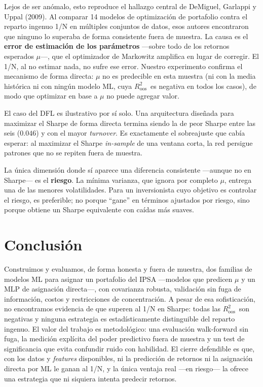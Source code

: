 \documentclass[11pt]{article}
\newcommand{\Roos}{$R^2_{\text{oos}}$}
\begin{document}
Lejos de ser anómalo, esto reproduce el hallazgo central de DeMiguel, Garlappi y Uppal (2009). Al
comparar 14 modelos de optimización de portafolio contra el reparto ingenuo 1/N en múltiples conjuntos
de datos, esos autores encontraron que ninguno lo superaba de forma consistente fuera de muestra. La
causa es el \textbf{error de estimación de los parámetros} ---sobre todo de los retornos esperados
$\mu$---, que el optimizador de Markowitz amplifica en lugar de corregir. El 1/N, al no estimar nada,
no sufre ese error. Nuestro experimento confirma el mecanismo de forma directa: $\mu$ no es predecible
en esta muestra (ni con la media histórica ni con ningún modelo ML, cuya \Roos\ es negativa en todos
los casos), de modo que optimizar en base a $\mu$ no puede agregar valor.

El caso del DFL es ilustrativo por sí solo. Una arquitectura diseñada para maximizar el Sharpe de
forma directa termina siendo la de peor Sharpe entre las seis ($0.046$) y con el mayor
\emph{turnover}. Es exactamente el sobreajuste que cabía esperar: al maximizar el Sharpe
\emph{in-sample} de una ventana corta, la red persigue patrones que no se repiten fuera de muestra.

La única dimensión donde sí aparece una diferencia consistente ---aunque no en Sharpe--- es el
\textbf{riesgo}. La mínima varianza, que ignora por completo $\mu$, entrega una de las menores volatilidades. Para un inversionista cuyo objetivo es controlar el riesgo, es preferible; no
porque ``gane'' en términos ajustados por riesgo, sino porque obtiene un Sharpe equivalente con caídas
más suaves.

\section{Conclusión}
Construimos y evaluamos, de forma honesta y fuera de muestra, dos familias de modelos ML para asignar
un portafolio del IPSA ---modelos que predicen $\mu$ y un MLP de asignación directa---, con covarianza
robusta, validación sin fuga de información, costos y restricciones de concentración. A pesar de esa
sofisticación, no encontramos evidencia de que superen al 1/N en Sharpe: todas las \Roos\ son
negativas y ninguna estrategia es estadísticamente distinguible del reparto ingenuo. El valor del
trabajo es metodológico: una evaluación walk-forward sin fuga, la medición explícita del poder
predictivo fuera de muestra y un test de significancia que evita confundir ruido con habilidad. El
cierre defendible es que, con los datos y \emph{features} disponibles, ni la predicción de retornos ni
la asignación directa por ML le ganan al 1/N, y la única ventaja real ---en riesgo--- la ofrece una
estrategia que ni siquiera intenta predecir retornos.
\end{document}
